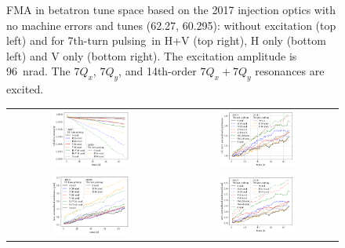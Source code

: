 \documentclass[%
 reprint,
 amsmath,amssymb,
 aps,
prstab,
longbibliography
]{revtex4-1}
\newcommand{\seventhtp}{7th-turn pulsing}
\begin{document}
\begin{figure}
\begin{tabular}{cc}
  \end{tabular}
  \caption{FMA in betatron tune space based on the 2017 injection
    optics with no machine errors and tunes (62.27, 60.295): without
    excitation (top left) and for \seventhtp\ in H+V (top right), H
    only (bottom left) and V only (bottom right). The excitation
    amplitude is 96~nrad. The $7 Q_x$, $7 Q_y$, and 14th-order
    $7 Q_x + 7 Q_y$ resonances are excited.}
  \label{fig:7th2017fma} 
\end{figure}


\begin{figure}
  \begin{tabular}{cc}
    \includegraphics[width=0.49\textwidth]{2016+2017injerra2b2uran1_2e-3_7th_3_5um_intensity.png} &
    \includegraphics[width=0.49\textwidth]{2016+2017injerra2b2uran1_2e-3_7th_3_5um_rel_emit2.png} \\
    \includegraphics[width=0.49\textwidth]{2016+2017injerra2b2uran1_2e-3_7th_3_5um_emit1.png} &
    \includegraphics[width=0.49\textwidth]{2016+2017injerra2b2uran1_2e-3_7th_3_5um_emit2.png} \\

\end{tabular}
\end{figure}
\end{document}
